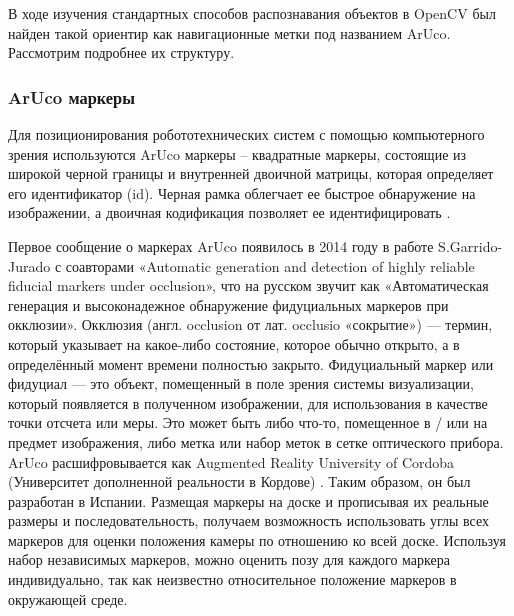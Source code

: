 В ходе изучения стандартных способов распознавания объектов в OpenCV был найден такой ориентир как навигационные метки под названием ArUco. Рассмотрим подробнее их структуру.

\subsubsection{ArUco маркеры}

Для позиционирования робототехнических систем с помощью компьютерного зрения используются ArUco маркеры -- квадратные маркеры, состоящие из широкой черной границы и внутренней двоичной матрицы, которая определяет его идентификатор (id). Черная рамка облегчает ее быстрое обнаружение на изображении, а двоичная кодификация позволяет ее идентифицировать \cite{opencv}.

Первое сообщение о маркерах ArUco появилось в 2014 году в работе S.Garrido-Jurado с соавторами «Automatic generation and detection of highly reliable fiducial markers under occlusion», что на русском звучит как «Автоматическая генерация и высоконадежное обнаружение фидуциальных маркеров при окклюзии».
Окклюзия (англ. occlusion от лат. occlusio «сокрытие») — термин, который указывает на какое-либо состояние, которое обычно открыто, а в определённый момент времени полностью закрыто.
Фидуциальный маркер или фидуциал — это объект, помещенный в поле зрения системы визуализации, который появляется в полученном изображении, для использования в качестве точки отсчета или меры. Это может быть либо что-то, помещенное в / или на предмет изображения, либо метка или набор меток в сетке оптического прибора.
ArUco расшифровывается как Augmented Reality University of Cordoba (Университет дополненной реальности в Кордове) \cite{aruco}. Таким образом, он был разработан в Испании.
Размещая маркеры на доске и прописывая их реальные размеры и последовательность, получаем возможность использовать углы всех маркеров для оценки положения камеры по отношению ко всей доске.
Используя набор независимых маркеров, можно оценить позу для каждого маркера индивидуально, так как неизвестно относительное положение маркеров в окружающей среде.

